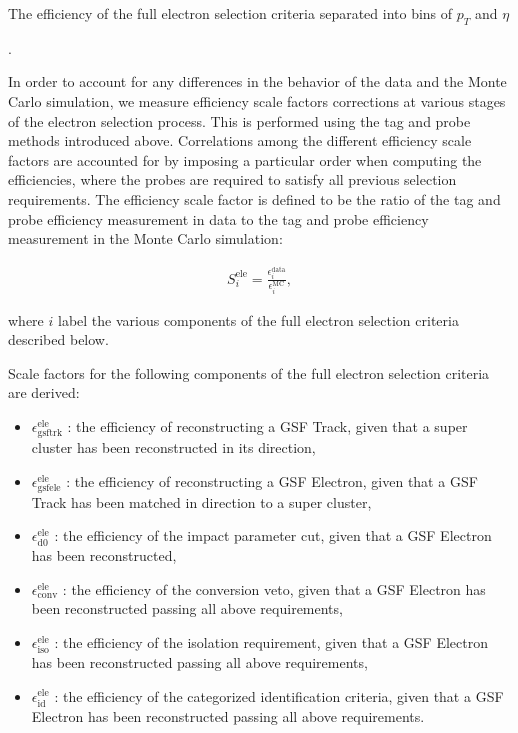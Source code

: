 \documentclass{cmspaper}
\begin{document}
\begin{table}[ht]
  \begin{center}
    
  \end{center}
  \caption{\label{tab:FullElectronSelectionFromMC} The efficiency of the full electron selection criteria separated into bins of $p_{T}$ and $\eta$}.
\end{table}

In order to account for any differences in the behavior of the data and the Monte Carlo simulation, we measure efficiency scale factors corrections at various stages of the electron selection process. This is performed using the tag and probe methods introduced above. Correlations among the different efficiency scale factors are accounted for by imposing a particular order when computing the efficiencies, where the probes are required to satisfy all previous selection requirements. The efficiency scale factor is defined to be the ratio of the tag and probe efficiency measurement in data to the tag and probe efficiency measurement in the Monte Carlo simulation:

\begin{eqnarray}
  \label{eqn:EfficiencyScaleFactor}  
  S_{i}^{\mathrm{ele}} = \frac{\epsilon_{i}^{\mathrm{data}}}{\epsilon_{i}^{\mathrm{MC}}},
\end{eqnarray}

where $i$ label the various components of the full electron selection criteria described below.


Scale factors for the following components of the full electron selection criteria are derived:
\begin{itemize}
\item $\epsilon_{\mathrm{gsftrk}}^{\mathrm{ele}}$ : the efficiency of reconstructing a GSF Track, given that a super cluster has been reconstructed in its direction,
\item $\epsilon_{\mathrm{gsfele}}^{\mathrm{ele}}$ : the efficiency of reconstructing a GSF Electron, given that a GSF Track has been matched in direction to a super cluster,
\item $\epsilon_{\mathrm{d0}}^{\mathrm{ele}}$ : the efficiency of the impact parameter cut, given that a GSF Electron has been reconstructed,
\item $\epsilon_{\mathrm{conv}}^{\mathrm{ele}}$ : the efficiency of the conversion veto, given that a GSF Electron has been reconstructed passing all above requirements,
\item $\epsilon_{\mathrm{iso}}^{\mathrm{ele}}$ : the efficiency of the isolation requirement, given that a GSF Electron has been reconstructed passing all above requirements,
\item $\epsilon_{\mathrm{id}}^{\mathrm{ele}}$ : the efficiency of the categorized identification criteria, given that a GSF Electron has been reconstructed passing all above requirements.
\end{itemize}
\end{document}
